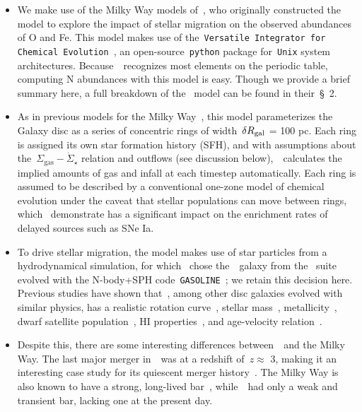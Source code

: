 \documentclass[ms.tex]{subfiles}
\begin{document}
\begin{itemize} 
	\item We make use of the Milky Way models of~\citet{Johnson2021}, who 
	originally constructed the model to explore the impact of stellar migration 
	on the observed abundances of O and Fe. 
	This model makes use of the~\texttt{Versatile Integrator for Chemical 
	Evolution}~\citep[\vice;][]{Johnson2020, Griffith2021, Johnson2021}, an 
	open-source~\texttt{python} package for~\texttt{Unix} system architectures. 
	Because~\vice~recognizes most elements on the periodic table, computing 
	N abundances with this model is easy. 
	Though we provide a brief summary here, a full breakdown of 
	the~\citet{Johnson2021} model can be found in their~\S~2. 

	\item As in previous models for the Milky Way~\citep[e.g.][]{Matteucci1989, 
	Schoenrich2009, Minchev2013, Minchev2014, Minchev2017, Sharma2020}, this 
	model parameterizes the Galaxy disc as a series of concentric rings of 
	width~$\delta R_\text{gal}$ = 100 pc.
	Each ring is assigned its own star formation history (SFH), and with 
	assumptions about the~$\Sigma_\text{gas}-\dot{\Sigma}_\star$ relation and 
	outflows (see discussion below),~\vice~calculates the implied amounts of 
	gas and infall at each timestep automatically. 
	Each ring is assumed to be described by a conventional one-zone model of 
	chemical evolution under the caveat that stellar populations can move 
	between rings, which~\citet{Johnson2021} demonstrate has a significant 
	impact on the enrichment rates of delayed sources such as SNe Ia. 

	\item To drive stellar migration, the model makes use of star particles 
	from a hydrodynamical simulation, for which~\citet{Johnson2021} chose 
	the~\hsim~galaxy from the~\citet{Christensen2012} suite evolved with the 
	N-body+SPH code~\texttt{GASOLINE}~\citep{Wadsley2004}; we retain this 
	decision here. 
	Previous studies have shown that~\hsim, among other disc galaxies evolved 
	with similar physics, has a realistic rotation curve~\citep{Governato2012, 
	Christensen2014a, Christensen2014b}, stellar mass~\citep{Munshi2013}, 
	metallicity~\citep{Christensen2016}, dwarf satellite 
	population~\citep{Zolotov2012,Brooks2014}, HI properties~\citep{Brooks2017}, 
	and age-velocity relation~\citep{Bird2021}. 

	\item Despite this, there are some interesting differences 
	between~\hsim~and the Milky Way. 
	The last major merger in~\hsim~was at a redshift of~$z \approx$ 3, making 
	it an interesting case study for its quiescent merger 
	history~\citep[e.g.][]{Zolotov2012}. 
	The Milky Way is also known to have a strong, long-lived 
	bar~\citep[e.g.][]{Bovy2019}, while~\hsim~had only a weak and transient 
	bar, lacking one at the present day. 


\end{itemize}
\end{document}
